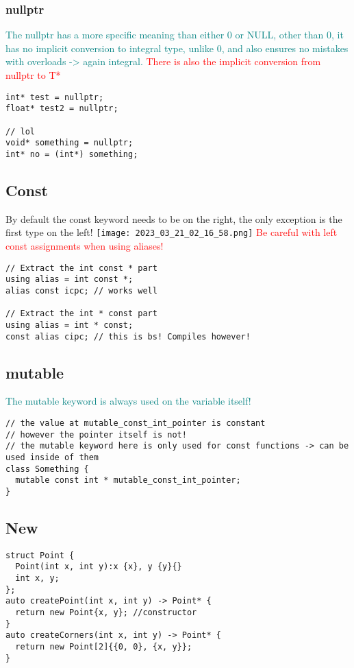 \documentclass[main.tex,fontsize=8pt,paper=a4,paper=portrait,DIV=calc,]{scrartcl}
\begin{document}
\subsubsection{nullptr}
\textcolor{teal}{The nullptr has a more specific meaning than either 0 or NULL, \newline
other than 0, it has no implicit conversion to integral type, unlike 0, and also ensures no mistakes with overloads -> again integral.}\newline
\textcolor{red}{There is also the implicit conversion from nullptr to T*}
\begin{lstlisting}
int* test = nullptr;
float* test2 = nullptr;

// lol
void* something = nullptr;
int* no = (int*) something;
\end{lstlisting}

\subsection{Const}
By default the const keyword needs to be on the right, the only exception is the first type on the left!\newline
\texttt{[image: 2023\_03\_21\_02\_16\_58.png]}\newline
\textcolor{red}{Be careful with left const assignments when using aliases!}
\begin{lstlisting}
// Extract the int const * part
using alias = int const *;
alias const icpc; // works well

// Extract the int * const part
using alias = int * const;
const alias cipc; // this is bs! Compiles however!
\end{lstlisting}

\subsection{mutable}
\textcolor{teal}{The mutable keyword is always used on the variable itself!}
\begin{lstlisting}
// the value at mutable_const_int_pointer is constant
// however the pointer itself is not!
// the mutable keyword here is only used for const functions -> can be used inside of them
class Something {
  mutable const int * mutable_const_int_pointer;
}
\end{lstlisting}

\subsection{New}
\begin{lstlisting}
struct Point {
  Point(int x, int y):x {x}, y {y}{}
  int x, y;
};
auto createPoint(int x, int y) -> Point* {
  return new Point{x, y}; //constructor
}
auto createCorners(int x, int y) -> Point* {
  return new Point[2]{{0, 0}, {x, y}};
}
\end{lstlisting}
\end{document}
